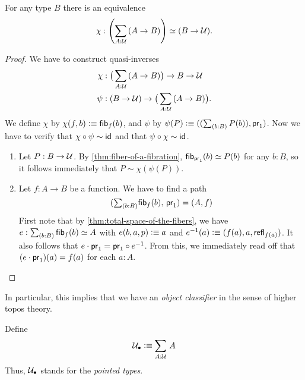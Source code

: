 \begin{thm}\label{thm:nobject_classifier_appetizer}
For any type $B$ there is an equivalence
\begin{equation*}
\chi:\left(\sm{A:\type} (A\to B)\right)\simeq (B\to\type).
\end{equation*}
\end{thm}
\begin{proof}
We have to construct quasi-inverses
\begin{align*}
\chi & : \big(\sm{A:\type} (A\to B)\big)\to B\to\type\\
\psi & : (B\to\type)\to\big(\sm{A:\type} (A\to B)\big).
\end{align*}
We define $\chi$ by $\chi(f,b)\vcentcolon\equiv{\mathsf{fib}}_{f}(b)$, and $\psi$ by $\psi(P)\defeq\pairr{(\sm{b:B} P(b)),\proj1}$.
Now we have to verify that $\chi\circ\psi\sim\mathsf{id}_{}{}$ and that $\psi\circ\chi \sim\mathsf{id}_{}{}$.
\begin{enumerate}
\item Let $P:B\to\mathcal{U}$.
  By \autoref{thm:fiber-of-a-fibration},
${\mathsf{fib}}_{\mathsf{pr}_{1}}(b)\simeq P(b)$ for any $b:B$, so it follows immediately
that $P\sim\chi(\psi(P))$.
\item Let $f:A\to B$ be a function. We have to find a path
\begin{equation*}
\pairr{\tsm{b:B} \hfiber{f}b,\,\proj1}=\pairr{A,f}
\end{equation*}
First note that by \autoref{thm:total-space-of-the-fibers}, we have
$e:\sm{b:B} \hfiber{f}b\simeq A$ with $e(b,a,p)\vcentcolon\equiv a$ and $e^{-1}(a)
\vcentcolon\equiv(f(a),a,\mathsf{refl}_{f(a)})$. It also follows that
$e\cdot\mathsf{pr}_{1}=\mathsf{pr}_{1}\circ e^{-1}$. From this, we immediately read off
that $(e\cdot\mathsf{pr}_{1})(a)= f(a)$ for each $a:A$.\qedhere
\end{enumerate}
\end{proof}

\noindent
In particular, this implies that we have an \emph{object classifier} in the sense of higher topos theory.

\begin{defn}
Define
\begin{equation*}
\pointed{\type}\defeq\sm{A:\type} A
\end{equation*}
Thus, $\mathcal{U}_\bullet$ stands for the \emph{pointed types}.
\end{defn}

